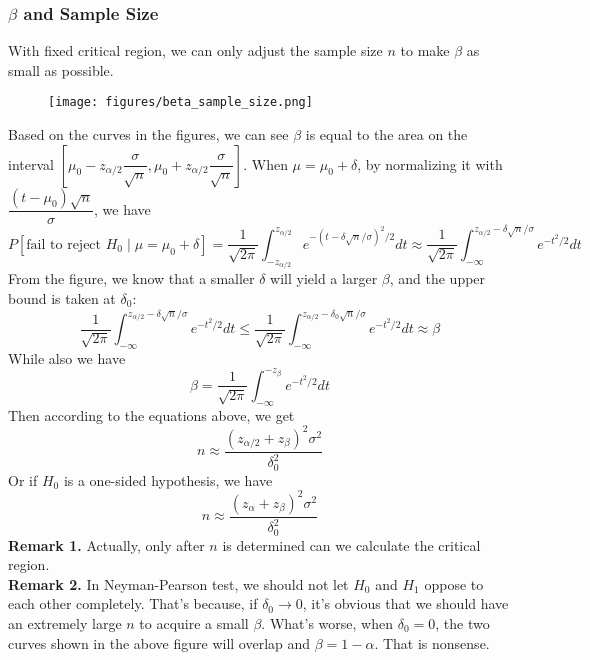 \documentclass[a4paper,12pt]{article}
\begin{document}
\subsubsection{$\beta$ and Sample Size}
With fixed critical region, we can only adjust the sample size $n$ to make $\beta$ as small as possible.\\
\begin{figure}[!h] 
    \centering
    \texttt{[image: figures/beta\_sample\_size.png]} 
\end{figure}
Based on the curves in the figures, we can see $\beta$ is equal to the area on the interval $ [\mu_0 - z_{\alpha / 2} \dfrac{\sigma}{\sqrt{n}}, \mu_0 + z_{\alpha / 2} \dfrac{\sigma}{\sqrt{n}}]$.
When $\mu = \mu_0 + \delta$, by normalizing it with $\dfrac{(t-\mu_0)\sqrt{n}}{\sigma}$, we have
$$
    P[\text{fail to reject } H_0 \mid \mu=\mu_0+\delta]=\frac{1}{\sqrt{2 \pi}} \int_{-z_{\alpha / 2}}^{z_{\alpha / 2}} e^{-(t-\delta \sqrt{n} / \sigma)^2 / 2} d t \approx \frac{1}{\sqrt{2 \pi}} \int_{-\infty}^{z_{\alpha / 2}-\delta \sqrt{n} / \sigma} e^{-t^2 / 2} d t
$$
From the figure, we know that a smaller $\delta$ will yield a larger $\beta$, and the upper bound is taken at $\delta_0$:
$$
\frac{1}{\sqrt{2 \pi}} \int_{-\infty}^{z_{\alpha / 2}-\delta \sqrt{n} / \sigma} e^{-t^2 / 2} d t \leq \frac{1}{\sqrt{2 \pi}} \int_{-\infty}^{z_{\alpha / 2}-\delta_0 \sqrt{n} / \sigma} e^{-t^2 / 2} d t \approx \beta
$$
While also we have
$$
    \beta=\frac{1}{\sqrt{2 \pi}} \int_{-\infty}^{-z_\beta} e^{-t^2 / 2} d t
$$
Then according to the equations above, we get 
\begin{equation}
    n \approx \frac{\left(z_{\alpha / 2}+z_\beta\right)^2 \sigma^2}{\delta_0^2}
    \end{equation}
Or if $H_0$ is a one-sided hypothesis, we have
\begin{equation}
    n \approx \frac{\left(z_{\alpha }+z_\beta\right)^2 \sigma^2}{\delta_0^2}
    \end{equation}
\textbf{Remark 1.} Actually, only after $n$ is determined can we calculate the critical region.\\
\textbf{Remark 2.} In Neyman-Pearson test, we should not let $H_0$ and $H_1$ oppose to each other completely. That's because, if $\delta_0 \rightarrow 0$, it's obvious that we should have an extremely large $n$ to acquire a small $\beta$. What's worse, when $\delta_0=0$, the two curves shown in the above figure will overlap and $\beta = 1-\alpha$. That is nonsense.
\end{document}
